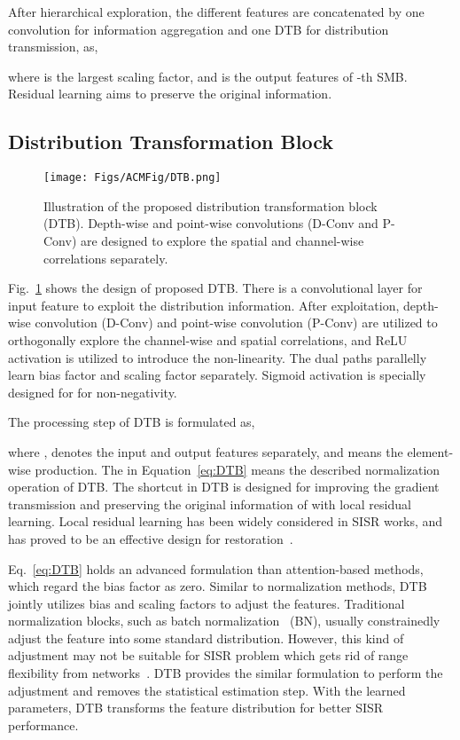 \documentclass[manuscript,screen]{acmart}
\begin{document}
After hierarchical exploration, the different features are concatenated by one  convolution for information aggregation and one DTB for distribution transmission, as,

where  is the largest scaling factor, and  is the output features of -th SMB. Residual learning aims to preserve the original information.

\subsection{Distribution Transformation Block}
\begin{figure}[t]
	\centering
	\texttt{[image: Figs/ACMFig/DTB.png]}
	\caption{Illustration of the proposed distribution transformation block (DTB). Depth-wise and point-wise convolutions (D-Conv and P-Conv) are designed to explore the spatial and channel-wise correlations separately.}
	\label{fig:DTB}
\end{figure}

Fig.~\ref{fig:DTB} shows the design of proposed DTB. There is a convolutional layer for input feature  to exploit the distribution information. After exploitation, depth-wise convolution (D-Conv) and point-wise convolution (P-Conv) are utilized to orthogonally explore the channel-wise and spatial correlations, and ReLU activation is utilized to introduce the non-linearity. The dual paths parallelly learn bias factor  and scaling factor  separately. Sigmoid activation is specially designed for  for non-negativity.

The processing step of DTB is formulated as,

where ,  denotes the input and output features separately, and  means the element-wise production. The  in Equation~\ref{eq:DTB} means the described normalization operation of DTB. The shortcut in DTB is designed for improving the gradient transmission and preserving the original information of  with local residual learning. Local residual learning has been widely considered in SISR works, and has proved to be an effective design for restoration~\cite{edsr_cvpr2017, rcan_eccv2018, rdn_pami2020, rfanet_cvpr2020}.

Eq.~\ref{eq:DTB} holds an advanced formulation than attention-based methods, which regard the bias factor  as zero. Similar to normalization methods, DTB jointly utilizes bias and scaling factors to adjust the features. Traditional normalization blocks, such as batch normalization~\cite{batchnorm_icml2015} (BN), usually constrainedly adjust the feature into some standard distribution. However, this kind of adjustment may not be suitable for SISR problem which gets rid of range flexibility from networks~\cite{edsr_cvpr2017}. DTB provides the similar formulation to perform the adjustment and removes the statistical estimation step. With the learned parameters, DTB transforms the feature distribution for better SISR performance.
\end{document}
